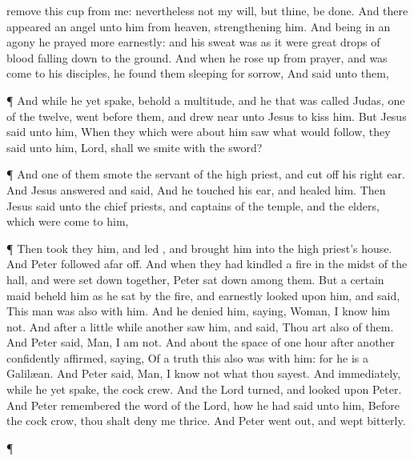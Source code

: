 {{{remove
this
cup
from
me:
nevertheless
not
my
will,
but
thine,
be done.}}
And there
appeared an
angel unto
him
from
heaven,
strengthening
him.
And
being
in an
agony he
prayed more
earnestly:
and
his
sweat
was as it
were great
drops of
blood falling
down
to the
ground.
And when he rose
up
from
prayer, and was
come
to his
disciples, he
found
them
sleeping
for
sorrow,
And
said unto
them,
{}
\par }{\PP {}¶
And while
he
yet
spake,
behold a
multitude,
and he
that was
called
Judas,
one of the
twelve, went
before
them,
and drew
near unto
Jesus to
kiss
him.
But
Jesus
said unto
him,
{}
When they which
were
about
him
saw what would
follow, they
said unto
him,
Lord,
shall we
smite
with the
sword?
\par }{\PP {}¶
And
one
of
them
smote the
servant of the high
priest,
and cut
off
his
right
ear.
And
Jesus
answered and
said,
{}
And he
touched
his
ear, and
healed
him.
Then
Jesus
said
unto the chief
priests,
and
captains of the
temple,
and the
elders,
which were
come
to
him,
{}
\par }{\PP {}¶
Then took
they
him, and
led
{},
and
brought
him
into the high
priest’s
house.
And
Peter
followed afar
off.
And when they had
kindled a
fire
in the
midst of the
hall,
and were set down
together,
Peter sat
down
among
them.
But a
certain
maid
beheld
him as he
sat
by the
fire,
and earnestly
looked upon
him, and
said, This
man
was
also
with
him.
And he
denied
him,
saying,
Woman, I
know
him
not.
And
after a little
while
another
saw
him,
and
said,
Thou art
also
of
them.
And
Peter
said,
Man, I
am
not.
And
about the
space of
one
hour
after
another confidently
affirmed,
saying,
Of a
truth
this
{}
also
was
with
him:
for he
is a
Galilæan.
And
Peter
said,
Man, I
know
not
what thou
sayest.
And
immediately, while
he
yet
spake, the
cock
crew.
And the
Lord
turned, and
looked upon
Peter.
And
Peter
remembered the
word of the
Lord,
how he had
said unto
him,
Before the
cock
crow, thou shalt
deny
me
thrice.
And
Peter
went
out, and
wept
bitterly.
\par }{\PP {}¶
}
